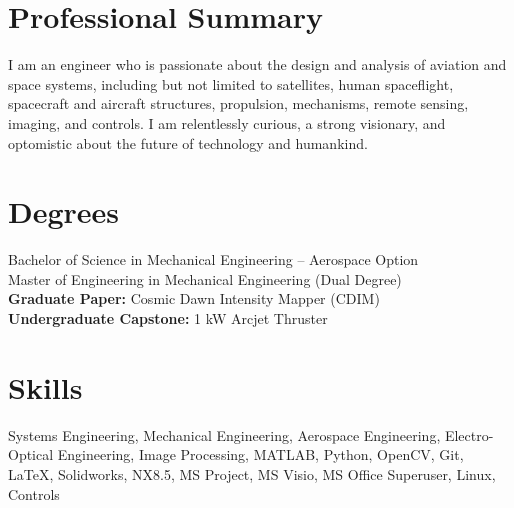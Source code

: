 \documentclass[10pt,final,sans]{resume}
\begin{document}
\setlength\headheight{28pt} %

\section{Professional Summary}
I am an engineer who is passionate about the design and analysis of
aviation and space systems, including but not limited to satellites, human
spaceflight, spacecraft and aircraft structures, propulsion, mechanisms, remote sensing, 
imaging, and controls. I am relentlessly curious, a strong visionary, and
optomistic about the future of technology and humankind.

\section{Degrees}
Bachelor of Science in Mechanical Engineering -- Aerospace Option \\
Master of Engineering in Mechanical Engineering (Dual Degree) \\
{\bf Graduate Paper:} Cosmic Dawn Intensity Mapper (CDIM) \\
{\bf Undergraduate Capstone:} 1 kW Arcjet Thruster

\section{Skills}
Systems Engineering, Mechanical Engineering, Aerospace Engineering, Electro-Optical Engineering, Image Processing, MATLAB, Python, OpenCV, Git, {\textrm \LaTeX}, Solidworks, NX8.5, MS Project, MS Visio, MS Office Superuser, Linux, Controls
\end{document}
